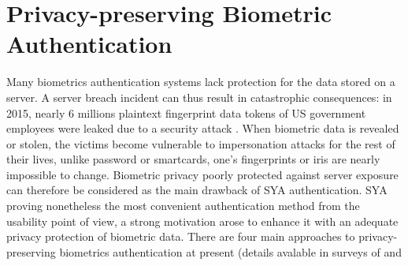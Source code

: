 \section{Privacy-preserving Biometric Authentication}
\label{sec:privacyLiteratures}
Many biometrics authentication systems lack protection for the data
stored on a server. A server breach incident can thus result in catastrophic
consequences: in 2015, nearly 6 millions plaintext fingerprint data tokens of US
government employees were leaked due to a security attack
\cite{OPMsays563:online}. When biometric data is revealed or stolen, the victims become vulnerable to impersonation attacks for the rest of their lives, unlike password or smartcards, one’s fingerprints or iris are nearly impossible to change. Biometric privacy poorly protected against server exposure can therefore be considered as the main drawback of SYA authentication. SYA proving nonetheless the most convenient authentication method from the usability point of view, a strong
motivation arose to enhance it with an adequate privacy protection of
biometric data. There are four main approaches to privacy-preserving biometrics
authentication at present (details avalable in surveys of \cite{jain201650} and
